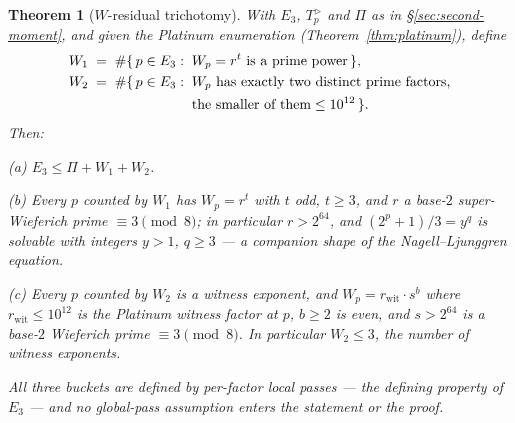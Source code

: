 \documentclass[11pt]{amsart}
\theoremstyle{plain}
\newtheorem{theorem}{Theorem}[section]
\theoremstyle{definition}
\theoremstyle{remark}
\numberwithin{equation}{section}
\begin{document}
\begin{theorem}[$W$-residual trichotomy]\label{thm:w-trichotomy}
With $E_3$, $T_p^{>}$ and $\Pi$ as in \S\ref{sec:second-moment}, and given the Platinum enumeration (Theorem~\ref{thm:platinum}), define
\[
  \begin{aligned}
  W_1 \;&=\; \#\{\,p \in E_3 :\; W_p = r^t \text{ is a prime power}\,\},\\
  W_2 \;&=\; \#\{\,p \in E_3 :\; W_p \text{ has exactly two distinct prime factors,}\\
  &\hphantom{{}=\;\#\{\,p \in E_3 :\;{}}\text{the smaller of them} \leq 10^{12}\,\}.
  \end{aligned}
\]
Then:

(a) $E_3 \leq \Pi + W_1 + W_2$.

(b) Every $p$ counted by $W_1$ has $W_p = r^t$ with $t$ odd, $t \geq 3$, and $r$ a base-$2$ \emph{super}-Wieferich prime $\equiv 3 \pmod 8$; in particular $r > 2^{64}$, and $(2^p + 1)/3 = y^q$ is solvable with integers $y > 1$, $q \geq 3$ --- a companion shape of the Nagell--Ljunggren equation.

(c) Every $p$ counted by $W_2$ is a witness exponent, and $W_p = r_{\mathrm{wit}} \cdot s^b$ where $r_{\mathrm{wit}} \leq 10^{12}$ is the Platinum witness factor at $p$, $b \geq 2$ is even, and $s > 2^{64}$ is a base-$2$ Wieferich prime $\equiv 3 \pmod 8$. In particular $W_2 \leq 3$, the number of witness exponents.

All three buckets are defined by per-factor \emph{local} passes --- the defining property of $E_3$ --- and no global-pass assumption enters the statement or the proof.
\end{theorem}
\end{document}
